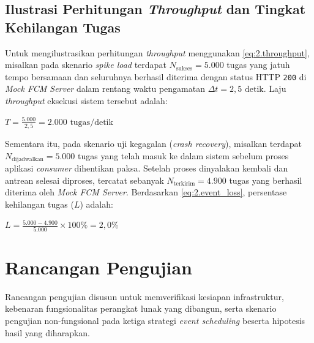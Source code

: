 \subsection{Ilustrasi Perhitungan \textit{Throughput} dan Tingkat Kehilangan Tugas} \label{III.Ilustrasi_Throughput}
Untuk mengilustrasikan perhitungan \textit{throughput} menggunakan \ref{eq:2.throughput}, misalkan pada skenario \textit{spike load} terdapat $N_{\text{sukses}} = 5.000$ tugas yang jatuh tempo bersamaan dan seluruhnya berhasil diterima dengan status HTTP \texttt{200} di \textit{Mock FCM Server} dalam rentang waktu pengamatan $\Delta t = 2{,}5\text{ detik}$. Laju \textit{throughput} eksekusi sistem tersebut adalah: \par
\vspace{8pt}
\begin{center}
$\displaystyle T = \frac{5.000}{2{,}5} = 2.000\text{ tugas/detik}$
\end{center}
\vspace{8pt}

Sementara itu, pada skenario uji kegagalan (\textit{crash recovery}), misalkan terdapat $N_{\text{dijadwalkan}} = 5.000$ tugas yang telah masuk ke dalam sistem sebelum proses aplikasi \textit{consumer} dihentikan paksa. Setelah proses dinyalakan kembali dan antrean selesai diproses, tercatat sebanyak $N_{\text{terkirim}} = 4.900$ tugas yang berhasil diterima oleh \textit{Mock FCM Server}. Berdasarkan \ref{eq:2.event_loss}, persentase kehilangan tugas ($L$) adalah: \par
\vspace{8pt}
\begin{center}
$\displaystyle L = \frac{5.000 - 4.900}{5.000} \times 100\% = 2{,}0\%$
\end{center}
\vspace{8pt}

\section{Rancangan Pengujian} \label{III.Rancang_Uji}
Rancangan pengujian disusun untuk memverifikasi kesiapan infrastruktur, kebenaran fungsionalitas perangkat lunak yang dibangun, serta skenario pengujian non-fungsional pada ketiga strategi \textit{event scheduling} beserta hipotesis hasil yang diharapkan. \par

